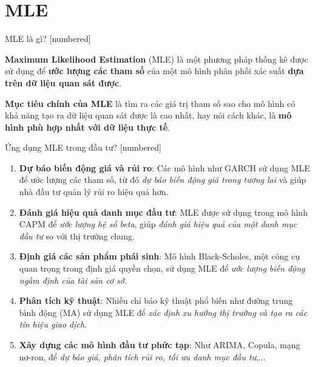 \section{MLE}
\begin{frame}[allowframebreaks=2]{MLE là gì?}
\transboxout
{}[numbered]
\begin{defn}[MLE]
    \textbf{Maximum Likelihood Estimation} (MLE) là một phương pháp thống kê được sử dụng để \textbf{ước lượng các tham số} của một mô hình phân phối xác suất \textbf{dựa trên dữ liệu quan sát được}. 
    
    \textbf{Mục tiêu chính của MLE} là tìm ra các giá trị tham số sao cho mô hình có khả năng tạo ra dữ liệu quan sát được là cao nhất, hay nói cách khác, là \textbf{mô hình phù hợp nhất với dữ liệu thực tế}.
\end{defn}

\pause
\end{frame}

\begin{frame}[allowframebreaks=2]{Ứng dụng MLE trong đầu tư?}
\transboxout
{}[numbered]
\begin{enumerate}
    \item \textbf{Dự báo biến động giá và rủi ro}: Các mô hình như GARCH sử dụng MLE để ước lượng các tham số, từ đó \textit{dự báo biến động giá trong tương lai} và giúp nhà đầu tư quản lý rủi ro hiệu quả hơn.
    
    \item \textbf{Đánh giá hiệu quả danh mục đầu tư}: MLE được sử dụng trong mô hình CAPM để \textit{ước lượng hệ số beta}, giúp \textit{đánh giá hiệu quả của một danh mục đầu tư} so với thị trường chung.
    
    \item \textbf{Định giá các sản phẩm phái sinh}: Mô hình Black-Scholes, một công cụ quan trọng trong định giá quyền chọn, sử dụng MLE để \textit{ước lượng biến động ngầm định của tài sản cơ sở.}
    
    \item \textbf{Phân tích kỹ thuật}: Nhiều chỉ báo kỹ thuật phổ biến như đường trung bình động (MA) sử dụng MLE để \textit{xác định xu hướng thị trường và tạo ra các tín hiệu giao dịch}.

    \item \textbf{Xây dựng các mô hình đầu tư phức tạp}: Như ARIMA, Copula, mạng nơ-ron, để \textit{dự báo giá, phân tích rủi ro, tối ưu danh mục đầu tư},...
\end{enumerate}
\pause
\end{frame}

